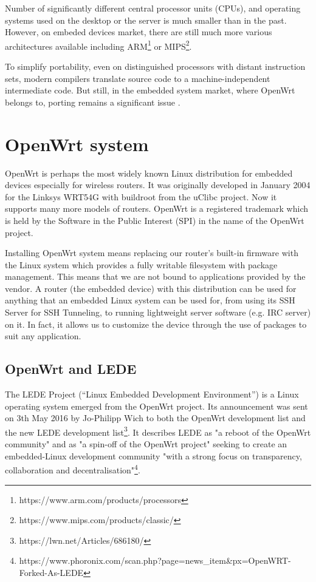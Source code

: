 Number of significantly different central processor units (CPUs), and operating systems used on the desktop or the server is much smaller than in the past.
However, on embeded devices market, there are still much more various architectures available including ARM\footnote{https://www.arm.com/products/processors} or MIPS\footnote{https://www.mips.com/products/classic/}.

To simplify portability, even on distinguished processors with distant instruction sets, modern compilers translate source code to a machine-independent intermediate code.
But still, in the embedded system market, where OpenWrt belongs to, porting remains a significant issue \cite{porting_software}.



\section{OpenWrt system}\label{owrt}
OpenWrt is perhaps the most widely known Linux distribution for embedded devices especially for wireless routers.
It was originally developed in January 2004 for the Linksys WRT54G with buildroot from the uClibc project.
Now it supports many more models of routers.
OpenWrt is a registered trademark which is held by the Software in the Public Interest (SPI) in the name of the OpenWrt project.

Installing OpenWrt system means replacing our router’s built-in firmware with the Linux system which provides a fully writable filesystem with package management.
This means that we are not bound to applications provided by the vendor.
A router (the embedded device) with this distribution can be used for anything that an embedded Linux system can be used for, from using its SSH Server for SSH Tunneling, to running lightweight server software (e.g. IRC server) on it.
In fact, it allows us to customize the device through the use of packages to suit any application. \cite{openwrt}



\subsection{OpenWrt and LEDE}

The LEDE Project (“Linux Embedded Development Environment”) is a Linux operating system emerged from the OpenWrt project.
Its announcement was sent on 3th May 2016 by Jo-Philipp Wich to both the OpenWrt development list and the new LEDE development list\footnote{https://lwn.net/Articles/686180/}.
It describes LEDE as "a reboot of the OpenWrt community" and as "a spin-off of the OpenWrt project" seeking to create an embedded-Linux development community "with a strong focus on transparency, collaboration and decentralisation"\footnote{https://www.phoronix.com/scan.php?page=news\_item\&px=OpenWRT-Forked-As-LEDE}.

